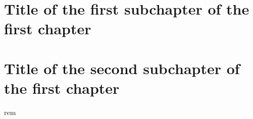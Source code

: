 \section{Title of the first subchapter of the first chapter}

\section{Title of the second subchapter of the first chapter}
rem
